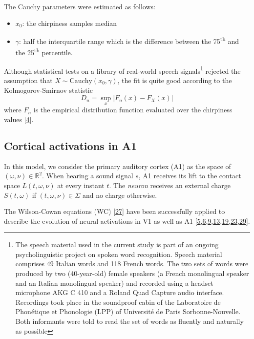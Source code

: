 \documentclass[
  american,
]{article}
\providecommand{\tightlist}{%
  \setlength{\itemsep}{0pt}\setlength{\parskip}{0pt}}
\begin{document}
The Cauchy parameters were estimated as follows:

\begin{itemize}
\tightlist
\item
  \(x_0\): the chirpiness samples median
\item
  \(\gamma\): half the interquartile range which is the difference between
  the 75\textsuperscript{th} and the 25\textsuperscript{th} percentile.
\end{itemize}

Although statistical tests on a library of real-world speech
signals\footnote{The speech material used in the current study is part of an ongoing
  psycholinguistic project on spoken word recognition.
  Speech material comprises 49 Italian words and 118 French words.
  The two sets of words were produced by two (40-year-old) female speakers
  (a French monolingual speaker and an Italian monolingual speaker) and recorded
  using a headset microphone AKG C 410 and a Roland Quad Capture audio interface.
  Recordings took place in the soundproof cabin of the Laboratoire de Phonétique
  et Phonologie (LPP) of Université de Paris Sorbonne-Nouvelle.
  Both informants were told to read the set of words as fluently and naturally as possible}
rejected the assumption that \(X\sim \mathrm{Cauchy}(x_0,\gamma)\),
the fit is quite good according to the Kolmogorov-Smirnov statistic
\begin{equation}
D_n=\sup_x\left\lvert F_n(x)-F_X(x)\right\rvert
\end{equation}
where \(F_n\) is the empirical distribution function
evaluated over the chirpiness values {[}\protect\hyperlink{ref-asswad2021}{4}{]}.

\hypertarget{cortical-activations-in-a1}{%
\subsection{Cortical activations in A1}\label{cortical-activations-in-a1}}

In this model, we consider the primary auditory cortex (A1) as the space of \((\omega,\nu)\in\mathbb{R}^2\).
When hearing a sound signal \(s\), A1 receives its lift to the contact space \(L(t,\omega,\nu)\)
at every instant \(t\).
The \emph{neuron} receives an external charge \(S(t,\omega)\) if \((t,\omega,\nu)\in\Sigma\) and no charge otherwise.

The Wilson-Cowan equations (WC) {[}\protect\hyperlink{ref-wilson1972}{27}{]} have been successfully applied to describe
the evolution of neural activations in V1 as well as A1
{[}\protect\hyperlink{ref-bertalmio2018}{5},\protect\hyperlink{ref-boscain2017}{6},\protect\hyperlink{ref-bressloff2002a}{9},\protect\hyperlink{ref-ermentrout1979}{13},\protect\hyperlink{ref-loebel2007}{19},\protect\hyperlink{ref-rankin2015}{23},\protect\hyperlink{ref-zulfiqar2019}{29}{]}.
\end{document}
